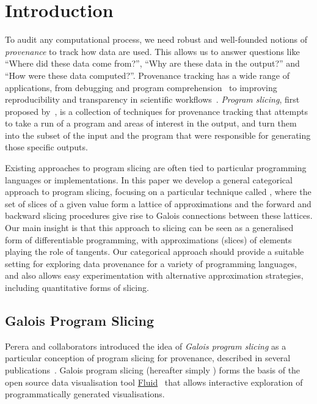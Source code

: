 \section{Introduction}
\label{sec:introduction}

To audit any computational process, we need robust and well-founded notions of \emph{provenance} to track how data are used. This allows us to answer questions like ``Where did these data come from?'', ``Why are these data in the output?'' and ``How were these data computed?''. Provenance tracking has a wide range of applications, from debugging and program comprehension~\cite{buneman95,cheney07} to improving reproducibility and transparency in scientific workflows~\cite{kontogiannis08}. \emph{Program slicing}, first proposed by~\citet{weiser81}, is a collection of techniques for provenance tracking that attempts to take a run of a program and areas of interest in the output, and turn them into the subset of the input and the program that were responsible for generating those specific outputs.

Existing approaches to program slicing are often tied to particular programming languages or implementations.
In this paper we develop a general categorical approach to program slicing, focusing on a particular technique
called \GPS, where the set of slices of a given value form a lattice of approximations and the forward and
backward slicing procedures give rise to Galois connections between these lattices. Our main insight is that
this approach to slicing can be seen as a generalised form of differentiable programming, with approximations
(slices) of elements playing the role of tangents. Our categorical approach should provide a suitable setting
for exploring data provenance for a variety of programming languages, and also allows easy experimentation
with alternative approximation strategies, including quantitative forms of slicing.

\subsection{Galois Program Slicing}
\label{sec:introduction:galois-slicing}

Perera and collaborators introduced the idea of {\em Galois program slicing} as a particular conception of program slicing for provenance, described in several publications~\cite{perera12a,perera16d,ricciotti17}. Galois program slicing (hereafter simply {\emph \GPS}) forms the basis of the open source data visualisation tool \href{https://f.luid.org/}{Fluid}~\cite{perera2025fluid} that allows interactive exploration of programmatically generated visualisations.

